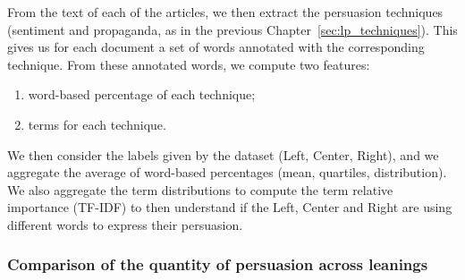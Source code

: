 From the text of each of the articles, we then extract the persuasion techniques (sentiment and propaganda, as in the previous Chapter~\ref{sec:lp_techniques}). This gives us for each document a set of words annotated with the corresponding technique. From these annotated words, we compute two features:
\begin{enumerate}
    \item word-based percentage of each technique;
    \item terms for each technique.
\end{enumerate}



We then consider the labels given by the dataset (Left, Center, Right), and we aggregate the average of word-based percentages (mean, quartiles, distribution). %
We also aggregate the term distributions to compute the term relative importance (TF-IDF) to then understand if the Left, Center and Right are using different words to express their persuasion.

\subsubsection{Comparison of the quantity of persuasion across leanings}

